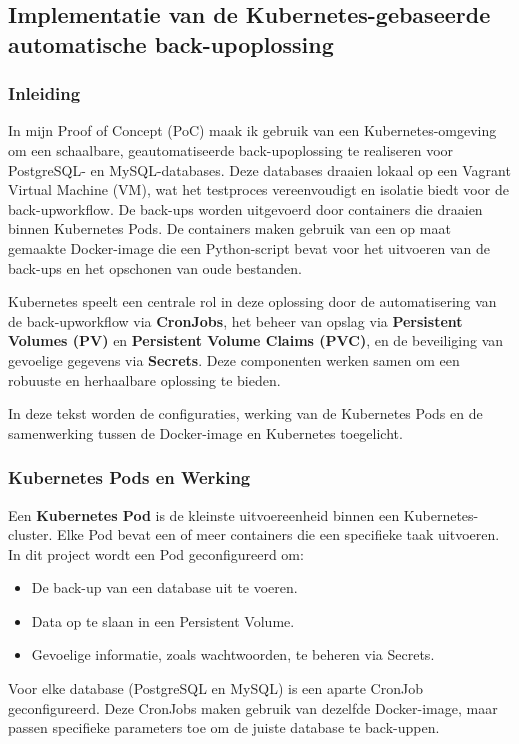 \subsection{Implementatie van de Kubernetes-gebaseerde automatische back-upoplossing}

\subsubsection{Inleiding}
In mijn Proof of Concept (PoC) maak ik gebruik van een Kubernetes-omgeving om een schaalbare, geautomatiseerde back-upoplossing te realiseren voor PostgreSQL- en MySQL-databases. Deze databases draaien lokaal op een Vagrant Virtual Machine (VM), wat het testproces vereenvoudigt en isolatie biedt voor de back-upworkflow. De back-ups worden uitgevoerd door containers die draaien binnen Kubernetes Pods. De containers maken gebruik van een op maat gemaakte Docker-image die een Python-script bevat voor het uitvoeren van de back-ups en het opschonen van oude bestanden.

Kubernetes speelt een centrale rol in deze oplossing door de automatisering van de back-upworkflow via \textbf{CronJobs}, het beheer van opslag via \textbf{Persistent Volumes (PV)} en \textbf{Persistent Volume Claims (PVC)}, en de beveiliging van gevoelige gegevens via \textbf{Secrets}. Deze componenten werken samen om een robuuste en herhaalbare oplossing te bieden.

In deze tekst worden de configuraties, werking van de Kubernetes Pods en de samenwerking tussen de Docker-image en Kubernetes toegelicht.

\subsubsection{Kubernetes Pods en Werking}
Een \textbf{Kubernetes Pod} is de kleinste uitvoereenheid binnen een Kubernetes-cluster. Elke Pod bevat een of meer containers die een specifieke taak uitvoeren. In dit project wordt een Pod geconfigureerd om:
\begin{itemize}
    \item De back-up van een database uit te voeren.
    \item Data op te slaan in een Persistent Volume.
    \item Gevoelige informatie, zoals wachtwoorden, te beheren via Secrets.
\end{itemize}

Voor elke database (PostgreSQL en MySQL) is een aparte CronJob geconfigureerd. Deze CronJobs maken gebruik van dezelfde Docker-image, maar passen specifieke parameters toe om de juiste database te back-uppen.

